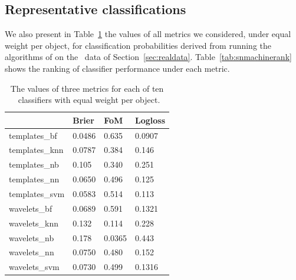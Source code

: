 \subsection{Representative classifications}
\label{sec:realresults}

We also present in Table~\ref{tab:snmachinevals} the values of all metrics we considered, under equal weight per object, for classification probabilities derived from running the algorithms of \cite{lochner_photometric_2016} on the \snphotcc\ data of Section~\ref{sec:realdata}.
Table~\ref{tab:snmachinerank} shows the ranking of classifier performance under each metric.

\begin{table}[]
\begin{tabular}{llll}
& Brier   & FoM   & Logloss            \\
\hline
templates\_bf  						 & 0.0486  & 0.635  & 0.0907  \\
templates\_knn             & 0.0787  & 0.384 & 0.146  \\
templates\_nb              & 0.105  & 0.340  & 0.251 \\
templates\_nn							 & 0.0650  & 0.496   & 0.125 \\
templates\_svm             & 0.0583 & 0.514  & 0.113 \\
wavelets\_bf   						 & 0.0689  & 0.591  & 0.1321 \\
wavelets\_knn              & 0.132  & 0.114 & 0.228 \\
wavelets\_nb               & 0.178  & 0.0365 & 0.443  \\
wavelets\_nn 							 & 0.0750  & 0.480  & 0.152 \\
wavelets\_svm              & 0.0730  & 0.499  & 0.1316 \\
\end{tabular}
\caption{The values of three metrics for each of ten \snmachine\ classifiers with equal weight per object.}
	\label{tab:snmachinevals}
\end{table}


